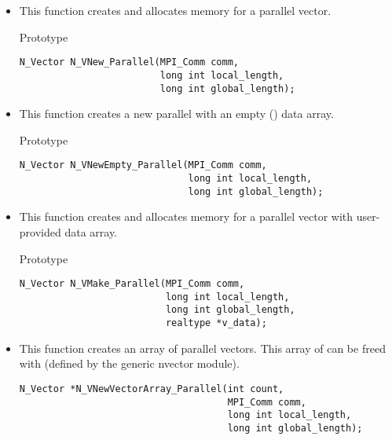 \begin{itemize}

\item  {}
  
  This function creates and allocates memory for a parallel vector.
 
  Prototype

\begin{verbatim}
N_Vector N_VNew_Parallel(MPI_Comm comm, 
                         long int local_length, 
                         long int global_length);
\end{verbatim}
  
\item {}
 
  This function creates a new parallel  with an empty () data array.
 
  Prototype

\begin{verbatim}
N_Vector N_VNewEmpty_Parallel(MPI_Comm comm, 
                              long int local_length, 
                              long int global_length);
\end{verbatim}

  
\item {}
  
  This function creates and allocates memory for a parallel vector
  with user-provided data array.
 
  Prototype

\begin{verbatim}
N_Vector N_VMake_Parallel(MPI_Comm comm, 
                          long int local_length,
                          long int global_length,
                          realtype *v_data);
\end{verbatim}

\item {}
 
  This function creates an array of  parallel vectors.
  This array of  can be freed with 
  (defined by the generic nvector module).
 
\begin{verbatim}
N_Vector *N_VNewVectorArray_Parallel(int count, 
                                     MPI_Comm comm, 
                                     long int local_length,
                                     long int global_length);
\end{verbatim}


\end{itemize}

